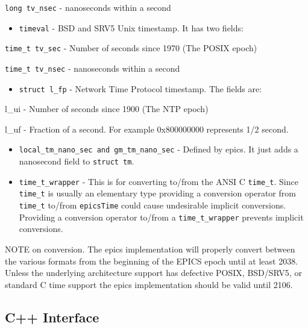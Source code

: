 \verb|long tv_nsec| - nanoseconds within a second

\begin{itemize}\item \verb|timeval| - BSD and SRV5 Unix timestamp. It has two fields:

\end{itemize}\verb|time_t tv_sec| - Number of seconds since 1970 (The POSIX epoch)

\verb|time_t tv_nsec| - nanoseconds within a second

\begin{itemize}\item \verb|struct l_fp| - Network Time Protocol timestamp. The fields are:

\end{itemize}l\_ui - Number of seconds since 1900 (The NTP epoch)

l\_uf - Fraction of a second. For example 0x800000000 represents 1/2 second.

\begin{itemize}\item \verb|local_tm_nano_sec and gm_tm_nano_sec| - Defined by epics. It just adds a nanosecond field to 
\verb|struct tm|.

\item \verb|time_t_wrapper| - This is for converting to/from the ANSI C \verb|time_t|. Since \verb|time_t| is usually an 
elementary type providing a conversion operator from \verb|time_t| to/from \verb|epicsTime| could cause undesirable 
implicit conversions. Providing a conversion operator to/from a \verb|time_t_wrapper| prevents implicit 
conversions.

\end{itemize}NOTE on conversion. The epics implementation will properly convert between the various formats from the beginning of 
the EPICS epoch until at least 2038. Unless the underlying architecture support has defective POSIX, BSD/SRV5, or 
standard C time support the epics implementation should be valid until 2106.

\subsection{C++ Interface}

